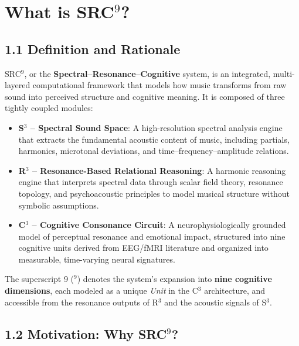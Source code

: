 










\section*{ What is SRC$^{9}$?}

\subsection*{1.1 Definition and Rationale}

SRC$^{9}$, or the \textbf{Spectral–Resonance–Cognitive} system, is an integrated, multi-layered computational framework that models how music transforms from raw sound into perceived structure and cognitive meaning. It is composed of three tightly coupled modules:

\begin{itemize}
    \item \textbf{S$^{3}$ – Spectral Sound Space}: A high-resolution spectral analysis engine that extracts the fundamental acoustic content of music, including partials, harmonics, microtonal deviations, and time–frequency–amplitude relations.
    
    \item \textbf{R$^{3}$ – Resonance-Based Relational Reasoning}: A harmonic reasoning engine that interprets spectral data through scalar field theory, resonance topology, and psychoacoustic principles to model musical structure without symbolic assumptions.
    
    \item \textbf{C$^{3}$ – Cognitive Consonance Circuit}: A neurophysiologically grounded model of perceptual resonance and emotional impact, structured into nine cognitive units derived from EEG/fMRI literature and organized into measurable, time-varying neural signatures.
\end{itemize}

The superscript 9 ($^{9}$) denotes the system's expansion into \textbf{nine cognitive dimensions}, each modeled as a unique \textit{Unit} in the C$^{3}$ architecture, and accessible from the resonance outputs of R$^{3}$ and the acoustic signals of S$^{3}$.

\subsection*{1.2 Motivation: Why SRC$^{9}$?}

